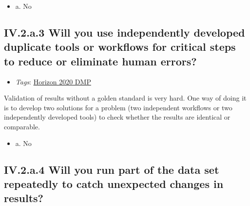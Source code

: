 \documentclass[a4paper,12pt]{report}
\begin{document}
\begin{itemize}
  \item[\CheckmarkBold] a. No
\end{itemize}




\subsection*{\protect\textcolor{colorSecId}{IV.2.a.3} Will you use independently developed duplicate tools or workflows for critical steps to reduce or eliminate human errors?}

\label{10a10ffd-bfe1-4c6b-bbb6-3dfb1e63a5d5.918d5fd1-ea37-468f-8acd-ca3e80203900.30d1e85c-0e3e-482f-97f9-22a7658b329e.34a3ef8b-4a17-4030-9157-ed1c1bf60b80}


\begin{itemize}
  \item \textit{Tags}: \ul{Horizon 2020 DMP}
  \end{itemize}


\noindent
\begin{markdown}
Validation of results without a golden standard is very hard. One way of doing it is to develop two solutions for a problem (two independent workflows or two independently developed tools) to check whether the results are identical or comparable.
\end{markdown}



\begin{itemize}
  \item[\CheckmarkBold] a. No
\end{itemize}




\subsection*{\protect\textcolor{colorSecId}{IV.2.a.4} Will you run part of the data set repeatedly to catch unexpected changes in results?}

\label{10a10ffd-bfe1-4c6b-bbb6-3dfb1e63a5d5.918d5fd1-ea37-468f-8acd-ca3e80203900.30d1e85c-0e3e-482f-97f9-22a7658b329e.faf72b3d-ac29-41d1-97f2-5223b199a086}
\end{document}
